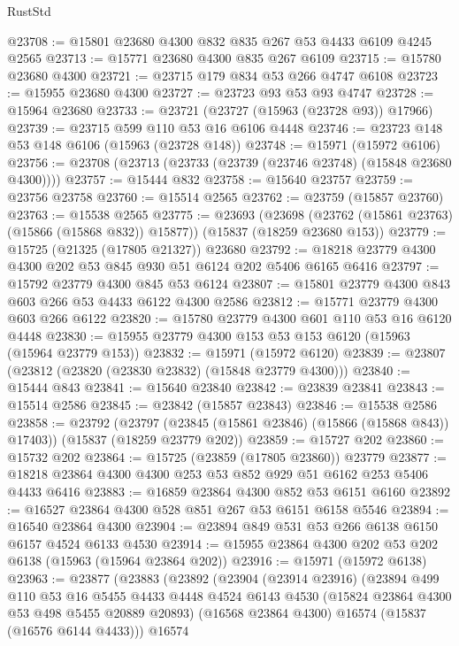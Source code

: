 \begin{lexlean}{RustStd}
\begin{coremodule}
{\begin{coremodule}
{{{{{{{{{{{{{{{{{{{{{{{{{{{{{{{{{{{{{{{{{{{{{{{{{{{{{{{{{{{{@23708 := @15801 @23680 @4300 @832 @835 @267 @53 @4433 @6109 @4245 @2565
@23713 := @15771 @23680 @4300 @835 @267 @6109
@23715 := @15780 @23680 @4300
@23721 := @23715 @179 @834 @53 @266 @4747 @6108
@23723 := @15955 @23680 @4300
@23727 := @23723 @93 @53 @93 @4747
@23728 := @15964 @23680
@23733 := @23721 (@23727 (@15963 (@23728 @93)) @17966)
@23739 := @23715 @599 @110 @53 @16 @6106 @4448
@23746 := @23723 @148 @53 @148 @6106 (@15963 (@23728 @148))
@23748 := @15971 (@15972 @6106)
@23756 := @23708 (@23713 (@23733 (@23739 (@23746 @23748) (@15848 @23680 @4300))))
@23757 := @15444 @832
@23758 := @15640 @23757
@23759 := @23756 @23758
@23760 := @15514 @2565
@23762 := @23759 (@15857 @23760)
@23763 := @15538 @2565
@23775 := @23693
    (@23698 (@23762 (@15861 @23763) (@15866 (@15868 @832)) @15877))
    (@15837 (@18259 @23680 @153))
@23779 := @15725 (@21325 (@17805 @21327)) @23680
@23792 := @18218 @23779 @4300 @4300 @202 @53 @845 @930 @51 @6124 @202 @5406 @6165 @6416
@23797 := @15792 @23779 @4300 @845 @53 @6124
@23807 := @15801 @23779 @4300 @843 @603 @266 @53 @4433 @6122 @4300 @2586
@23812 := @15771 @23779 @4300 @603 @266 @6122
@23820 := @15780 @23779 @4300 @601 @110 @53 @16 @6120 @4448
@23830 := @15955 @23779 @4300 @153 @53 @153 @6120 (@15963 (@15964 @23779 @153))
@23832 := @15971 (@15972 @6120)
@23839 := @23807 (@23812 (@23820 (@23830 @23832) (@15848 @23779 @4300)))
@23840 := @15444 @843
@23841 := @15640 @23840
@23842 := @23839 @23841
@23843 := @15514 @2586
@23845 := @23842 (@15857 @23843)
@23846 := @15538 @2586
@23858 := @23792
    (@23797 (@23845 (@15861 @23846) (@15866 (@15868 @843)) @17403))
    (@15837 (@18259 @23779 @202))
@23859 := @15727 @202
@23860 := @15732 @202
@23864 := @15725 (@23859 (@17805 @23860)) @23779
@23877 := @18218 @23864 @4300 @4300 @253 @53 @852 @929 @51 @6162 @253 @5406 @4433 @6416
@23883 := @16859 @23864 @4300 @852 @53 @6151 @6160
@23892 := @16527 @23864 @4300 @528 @851 @267 @53 @6151 @6158 @5546
@23894 := @16540 @23864 @4300
@23904 := @23894 @849 @531 @53 @266 @6138 @6150 @6157 @4524 @6133 @4530
@23914 := @15955 @23864 @4300 @202 @53 @202 @6138 (@15963 (@15964 @23864 @202))
@23916 := @15971 (@15972 @6138)
@23963 := @23877
    (@23883
      (@23892
        (@23904
          (@23914 @23916)
          (@23894
            @499
            @110
            @53
            @16
            @5455
            @4433
            @4448
            @4524
            @6143
            @4530
            (@15824 @23864 @4300 @53 @498 @5455 @20889 @20893)
            (@16568 @23864 @4300)
            @16574
            (@15837 (@16576 @6144 @4433)))
          @16574
}}}}}}}}}}}}}}}}}}}}}}}}}}}}}}}}}}}}}}}}}}}}}}}}}}}}}}}}}}}}
\end{coremodule}}
\end{coremodule}
\end{lexlean}

